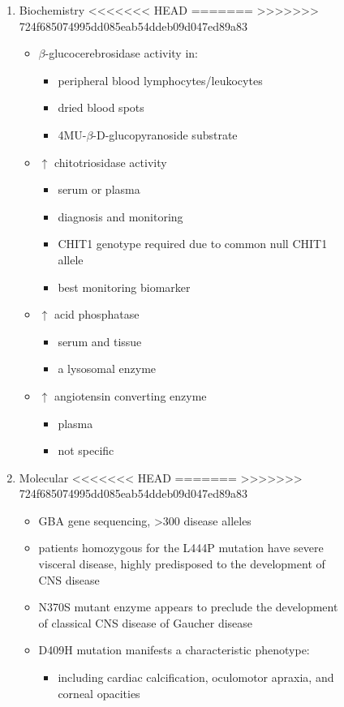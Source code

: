 \documentclass[fontsize=12pt]{scrartcl}
\begin{document}
\begin{enumerate}
\begin{enumerate}
\begin{enumerate}
\begin{enumerate}
\begin{table}[htbp]
\begin{enumerate}
\begin{enumerate}
\begin{table}[htbp]
\begin{figure}[htbp]
\begin{enumerate}
\item Biochemistry
<<<<<<< HEAD
\label{sec:org0be73db}
=======
\label{sec:orgf6da5bd}
>>>>>>> 724f685074995dd085eab54ddeb09d047ed89a83
\begin{itemize}
\item \(\beta\)-glucocerebrosidase activity in:
\begin{itemize}
\item peripheral blood lymphocytes/leukocytes
\item dried blood spots
\item 4MU-\(\beta\)-D-glucopyranoside substrate
\end{itemize}
\item \(\uparrow\) chitotriosidase activity
\begin{itemize}
\item serum or plasma
\item diagnosis and monitoring
\item CHIT1 genotype required due to common null CHIT1 allele
\item best monitoring biomarker
\end{itemize}
\item \(\uparrow\) acid phosphatase
\begin{itemize}
\item serum and tissue
\item a lysosomal enzyme
\end{itemize}
\item \(\uparrow\) angiotensin converting enzyme
\begin{itemize}
\item plasma
\item not specific
\end{itemize}
\end{itemize}

\item Molecular
<<<<<<< HEAD
\label{sec:org3e733fa}
=======
\label{sec:org22de931}
>>>>>>> 724f685074995dd085eab54ddeb09d047ed89a83
\begin{itemize}
\item GBA gene sequencing, >300 disease alleles
\item patients homozygous for the L444P mutation have severe visceral
disease, highly predisposed to the development of CNS disease
\item N370S mutant enzyme appears to preclude the development of classical CNS disease of Gaucher disease
\item D409H mutation manifests a characteristic phenotype:
\begin{itemize}
\item including cardiac calcification, oculomotor apraxia, and corneal opacities
\end{itemize}
\end{itemize}
\end{enumerate}


\end{figure}
\end{table}
\end{enumerate}
\end{enumerate}
\end{table}
\end{enumerate}
\end{enumerate}
\end{enumerate}
\end{enumerate}
\end{document}

